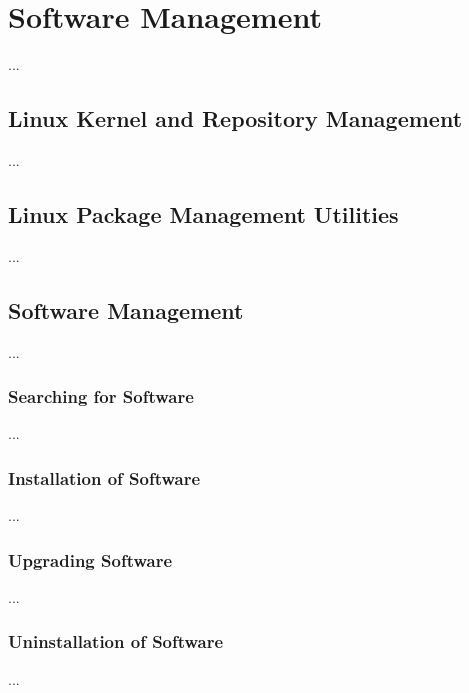 \chapter{Software Management}

...

\section{Linux Kernel and Repository Management}

...

\section{Linux Package Management Utilities}

...

\section{Software Management}
...

\subsection{Searching for Software}
...

\subsection{Installation of Software}

...

\subsection{Upgrading Software}
...

\subsection{Uninstallation of Software}

...
















